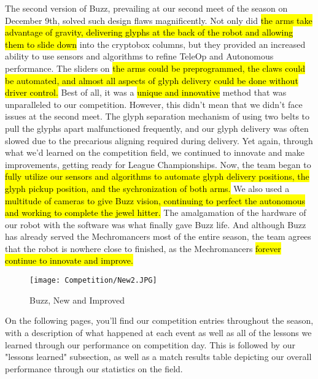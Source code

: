The second version of Buzz, prevailing at our second meet of the season on December 9th, solved such design flaws magnificently. Not only did \hl{the arms take advantage of gravity, delivering glyphs at the back of the robot and allowing them to slide down} into the cryptobox columns, but they provided an increased ability to use sensors and algorithms to refine TeleOp and Autonomous performance. The sliders on \hl{the arms could be preprogrammed, the claws could be automated, and almost all aspects of glyph delivery could be done without driver control.} Best of all, it was a \hl{unique and innovative} method that was unparalleled to our competition. However, this didn't mean that we didn't face issues at the second meet. The glyph separation mechanism of using two belts to pull the glyphs apart malfunctioned frequently, and our glyph delivery was often slowed due to the precarious aligning required during delivery. Yet again, through what we'd learned on the competition field, we continued to innovate and make improvements, getting ready for League Championships. Now, the team began to \hl{fully utilize our sensors and algorithms to automate glyph delivery positions, the glyph pickup position, and the sychronization of both arms.} We also used a \hl{multitude of cameras to give Buzz vision, continuing to perfect the autonomous and working to complete the jewel hitter.} The amalgamation of the hardware of our robot with the software was what finally gave Buzz life. And although Buzz has already served the Mechromancers most of the entire season, the team agrees that the robot is nowhere close to finished, as the Mechromancers \hl{forever continue to innovate and improve.} 
  \begin{figure}[htp]
  \centering
    \texttt{[image: Competition/New2.JPG]}
   \caption{Buzz, New and Improved}
   \label{fig:NewBuzz}
  \end{figure}
  On the following pages, you'll find our competition entries throughout the season, with a description of what happened at each event as well as all of the lessons we learned through our performance on competition day. This is followed by our "lessons learned" subsection, as well as a match results table depicting our overall performance through our statistics on the field. 